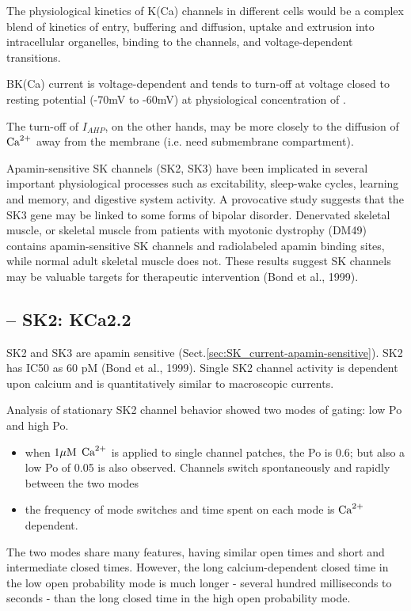 The physiological kinetics of K(Ca) channels in different cells would be a
complex blend of kinetics of  entry,  buffering and
diffusion,  uptake and extrusion into intracellular organelles,
 binding to the channels, and voltage-dependent transitions.



\begin{mdframed}

BK(Ca) current is voltage-dependent and tends to turn-off at voltage
closed to resting potential (-70mV to -60mV) at physiological concentration of
. 

The turn-off of $I_{AHP}$, on the other hands, may be more closely to the
diffusion of ${\text{Ca}^{2+}}$ away from the membrane (i.e. need submembrane compartment).
\end{mdframed}

Apamin-sensitive SK channels (SK2, SK3) have been implicated in several
important physiological processes such as excitability, sleep-wake cycles,
learning and memory, and digestive system activity. A provocative study suggests
that the SK3 gene may be linked to some forms of bipolar disorder.
Denervated skeletal muscle, or skeletal muscle from patients with myotonic dystrophy
(DM49) contains apamin-sensitive SK channels and radiolabeled apamin binding sites,
while normal adult skeletal muscle does not. These results suggest SK channels may
be valuable targets for therapeutic intervention (Bond et al., 1999).

\subsection{-- SK2: KCa2.2}
\label{sec:SK_current-2.2}

SK2 and SK3 are apamin sensitive (Sect.\ref{sec:SK_current-apamin-sensitive}).
SK2 has IC50 as 60 pM (Bond et al., 1999).
Single SK2 channel activity is dependent upon calcium and is quantitatively
similar to macroscopic currents.

Analysis of stationary SK2 channel behavior showed two modes of gating: low Po
and high Po.
\begin{itemize}
  \item  
  when $1{\mu\text{M}}$ ${\text{Ca}^{2+}}$ is applied to single channel patches, the Po is 0.6; but
  also a low Po of 0.05 is also observed. Channels switch spontaneously and
  rapidly between the two modes
  
  \item the frequency of mode switches and time spent on each mode is ${\text{Ca}^{2+}}$
  dependent.
\end{itemize}
The two modes share many features, having similar open times and short and
intermediate closed times.
However, the long calcium-dependent closed time in the low open probability mode
is much longer - several hundred milliseconds to seconds - than the long closed
time in the high open probability mode.

